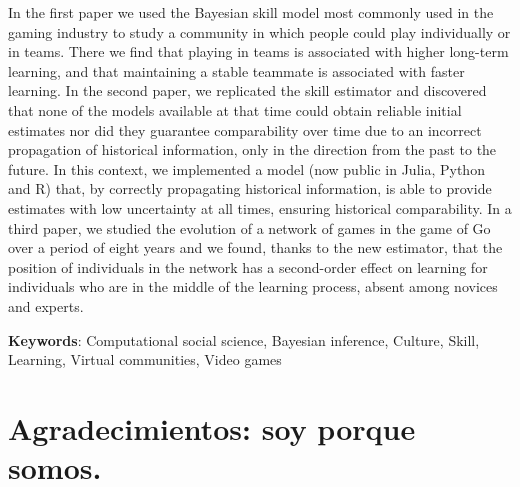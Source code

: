 \documentclass[a4paper,11pt]{book}
\theoremstyle{definition}
\begin{document}

In the first paper we used the Bayesian skill model most commonly used in the gaming industry to study a community in which people could play individually or in teams.
There we find that playing in teams is associated with higher long-term learning, and that maintaining a stable teammate is associated with faster learning.
In the second paper, we replicated the skill estimator and discovered that none of the models available at that time could obtain reliable initial estimates nor did they guarantee comparability over time due to an incorrect propagation of historical information, only in the direction from the past to the future.
In this context, we implemented a model (now public in Julia, Python and R) that, by correctly propagating historical information, is able to provide estimates with low uncertainty at all times, ensuring historical comparability.
In a third paper, we studied the evolution of a network of games in the game of Go over a period of eight years and we found, thanks to the new estimator, that the position of individuals in the network has a second-order effect on learning for individuals who are in the middle of the learning process, absent among novices and experts.
%
\vspace{0.1cm}

\noindent \textbf{Keywords}: Computational social science, Bayesian inference, Culture, Skill, Learning, Virtual communities, Video games

\normalsize

\tableofcontents

\newpage

\vfill


\normalsize

\chapter{Agradecimientos: soy porque somos.}
\end{document}
